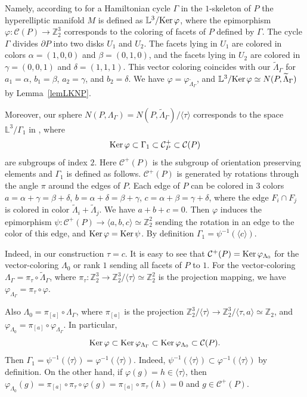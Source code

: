 \documentclass[12pt]{amsart}
\theoremstyle{definition}
\theoremstyle{remark}
\begin{document}
Namely, according to \cite[Theorem 3.1]{VM99S2} for a Hamiltonian cycle $\Gamma$ in the $1$-skeleton of $P$ the hyperelliptic manifold $M$ is defined
as $\mathbb L^3/{\rm Ker}\,\varphi$,  where the epimorphism 
$\varphi\colon \mathcal{C}(P)\to\mathbb Z_2^3$
corresponds to the coloring of facets of $P$ defined by $\Gamma$. The cycle $\Gamma$ divides $\partial P$
into two disks $U_1$ and $U_2$.  The facets lying in $U_1$ are colored in colors $\alpha=(1,0,0)$ and 
$\beta=(0,1,0)$, and the facets lying in $U_2$ are colored in $\gamma=(0,0,1)$ and $\delta=(1,1,1)$. This vector
coloring coincides with our $\widetilde{\Lambda}_\Gamma$ for $a_1=\alpha$, $b_1=\beta$, $a_2=\gamma$, and $b_2=\delta$.
We have $\varphi=\varphi_{\widetilde{\Lambda}_\Gamma}$, 
and $\mathbb L^3/{\rm Ker}\,\varphi\simeq N(P,\widetilde{\Lambda}_\Gamma)$ by Lemma~\ref{lemLKNP}.

Moreover, our sphere $N(P,\Lambda_\Gamma)=N(P,\widetilde\Lambda_\Gamma)/\langle\tau\rangle$ corresponds to the space 
$\mathbb L^3/\Gamma_1$ in \cite{VM99S2}, where 
$$
{\rm Ker}\,\varphi\subset \Gamma_1\subset \mathcal{C}^+_P\subset \mathcal{C}(P)
$$
are subgroups of index $2$.
Here  $\mathcal{C}^+(P)$ is the subgroup of orientation preserving elements and $\Gamma_1$ is defined 
as follows.  $\mathcal{C}^+(P)$  is generated by rotations through the angle $\pi$ around the edges of $P$. Each edge 
of $P$ can be  colored in $3$ colors $a=\alpha+\gamma=\beta+\delta$, $b=\alpha+\delta=\beta+\gamma$,
$c=\alpha+\beta=\gamma+\delta$, where the edge $F_i\cap F_j$ is colored in color $\widetilde\Lambda_i+\widetilde\Lambda_j$. 
We have $a+b+c=0$.
Then $\varphi$ induces the epimorphism $\psi\colon \mathcal{C}^+(P)\to \langle a,b,c\rangle\simeq
\mathbb Z_2^2$ sending the rotation in an edge to the color of this edge, and 
${\rm Ker}\,\varphi={\rm Ker}\,\psi$. By definition $\Gamma_1=\psi^{-1}(\langle c\rangle)$.

Indeed, in our construction $\tau=c$. It is easy to see that $\mathcal{C}^+(P)={\rm Ker}\,\varphi_{\Lambda_0}$ for
the vector-coloring $\Lambda_0$ or rank $1$ sending all facets of $P$ to $1$. For the vector-coloring 
$\Lambda_\Gamma=\pi_\tau\circ\widetilde{\Lambda}_\Gamma$, where  
$\pi_\tau\colon \mathbb Z_2^3\to \mathbb Z_2^3/\langle\tau\rangle\simeq\mathbb Z_2^2$ is the projection mapping, 
we have  $\varphi_{\Lambda_\Gamma}=\pi_\tau\circ \varphi$.

Also $\Lambda_0=\pi_{[a]}\circ \Lambda_{\Gamma}$, where 
$\pi_{[a]}$ is the projection 
$\mathbb Z_2^3/\langle\tau\rangle\to \mathbb Z_2^3/\langle\tau,a\rangle\simeq\mathbb Z_2$, and  
$\varphi_{\Lambda_0}=\pi_{[a]}\circ \varphi_{\Lambda_{\Gamma}}$.
In particular, 
$$
{\rm Ker}\,\varphi\subset {\rm Ker}\,\varphi_{\Lambda_{\Gamma}}\subset 
{\rm Ker}\,\varphi_{\Lambda_0}\subset \mathcal{C}(P).
$$
Then $\Gamma_1=\psi^{-1}(\langle\tau\rangle)=\varphi^{-1}(\langle\tau\rangle)$. Indeed, 
$\psi^{-1}(\langle\tau\rangle)\subset \varphi^{-1}(\langle\tau\rangle)$ by definition. On the other hand, if 
$\varphi(g)=h\in\langle\tau\rangle$, then $\varphi_{\Lambda_0}(g)=\pi_{[a]}\circ \pi_\tau\circ\varphi(g)=\pi_{[a]}\circ \pi_\tau(h)=0$ and $g\in \mathcal{C}^+(P)$.
\end{document}
